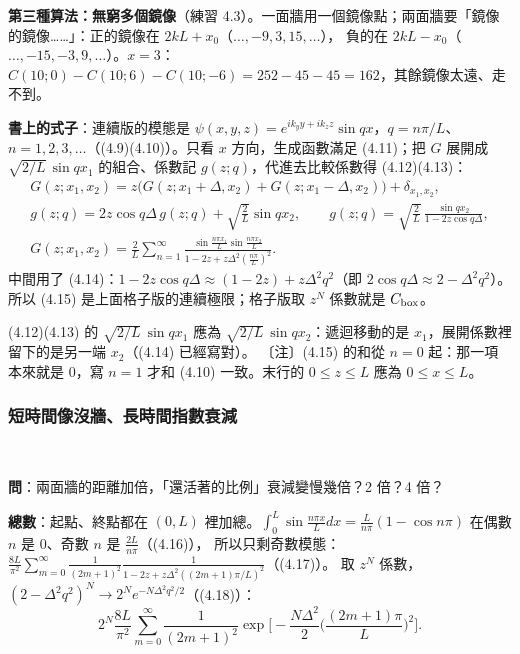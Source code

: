 \textbf{第三種算法：無窮多個鏡像}（練習 4.3）。一面牆用一個鏡像點；兩面牆要「鏡像的鏡像……」：正的鏡像在 $2kL+x_0$（$\dots,-9,3,15,\dots$），
負的在 $2kL-x_0$（$\dots,-15,-3,9,\dots$）。$x=3$：$C(10;0)-C(10;6)-C(10;-6)=252-45-45=162$，其餘鏡像太遠、走不到。

\textbf{書上的式子}：連續版的模態是 $\psi(x,y,z)=e^{ik_yy+ik_zz}\sin qx$，$q=n\pi/L$、$n=1,2,3,\dots$（(4.9)(4.10)）。只看 $x$ 方向，生成函數滿足 (4.11)；把 $G$ 展開成 $\sqrt{2/L}\,\sin qx_1$ 的組合、係數記 $g(z;q)$，代進去比較係數得 (4.12)(4.13)：
\begin{gather*}
G(z;x_1,x_2)=z\big(G(z;x_1+\Delta,x_2)+G(z;x_1-\Delta,x_2)\big)+\delta_{x_1,x_2},\tag{4.11}\\
g(z;q)=2z\cos q\Delta\,g(z;q)+\sqrt{\frac2L}\sin qx_2,\qquad g(z;q)=\sqrt{\frac2L}\,\frac{\sin qx_2}{1-2z\cos q\Delta},\tag{4.12, 4.13}\\
G(z;x_1,x_2)=\frac2L\sum_{n=1}^{\infty}\frac{\sin\frac{n\pi x_1}{L}\sin\frac{n\pi x_2}{L}}{1-2z+z\Delta^2(\frac{n\pi}{L})^2}.\tag{4.15}
\end{gather*}
中間用了 (4.14)：$1-2z\cos q\Delta\approx(1-2z)+z\Delta^2q^2$（即 $2\cos q\Delta\approx2-\Delta^2q^2$）。所以 (4.15) 是上面格子版的連續極限；格子版取 $z^N$ 係數就是 $C_{\rm box}$。
\begin{errbox}[p.~75，(4.12)(4.13)(4.15) 與末行]
(4.12)(4.13) 的 $\sqrt{2/L}\,\sin qx_1$ 應為 $\sqrt{2/L}\,\sin qx_2$：遞迴移動的是 $x_1$，展開係數裡留下的是另一端 $x_2$（(4.14) 已經寫對）。
〔注〕(4.15) 的和從 $n=0$ 起：那一項本來就是 0，寫 $n=1$ 才和 (4.10) 一致。末行的 $0\le z\le L$ 應為 $0\le x\le L$。
\end{errbox}

\subsubsection{短時間像沒牆、長時間指數衰減}
\ 

\textbf{問}：兩面牆的距離加倍，「還活著的比例」衰減變慢幾倍？2 倍？4 倍？

\textbf{總數}：起點、終點都在 $(0,L)$ 裡加總。$\int_0^L\sin\frac{n\pi x}{L}dx=\frac{L}{n\pi}(1-\cos n\pi)$ 在偶數 $n$ 是 0、奇數 $n$ 是 $\frac{2L}{n\pi}$（(4.16)），
所以只剩奇數模態：$\frac{8L}{\pi^2}\sum_{m=0}^\infty\frac{1}{(2m+1)^2}\frac{1}{1-2z+z\Delta^2((2m+1)\pi/L)^2}$（(4.17)）。
取 $z^N$ 係數，$(2-\Delta^2q^2)^N\to2^Ne^{-N\Delta^2q^2/2}$（(4.18)）：
\[2^N\frac{8L}{\pi^2}\sum_{m=0}^\infty\frac{1}{(2m+1)^2}\exp\Big[-\frac{N\Delta^2}{2}\Big(\frac{(2m+1)\pi}{L}\Big)^2\Big].\tag{4.19}\]

